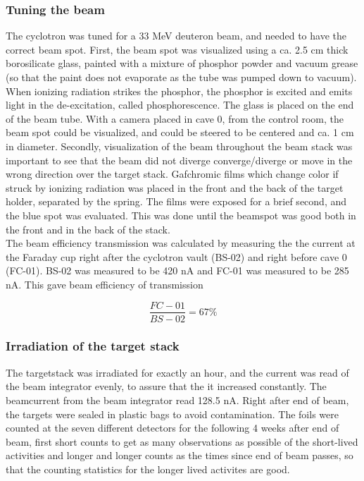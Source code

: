 \subsubsection{Tuning the beam}
The cyclotron was tuned for a 33 MeV deuteron beam, and needed to have the correct beam spot. First, the beam spot was visualized using a ca. 2.5 cm thick borosilicate glass, painted with a mixture of phosphor powder and vacuum grease (so that the paint does not evaporate as the tube was pumped down to vacuum). When ionizing radiation strikes the phosphor, the phosphor is excited and emits light in the de-excitation, called phosphorescence.  The glass is placed on the end of the beam tube. With a camera placed in cave 0, from the control room, the beam spot could be visualized, and could be steered to be centered and ca. 1 cm in diameter. Secondly, visualization of the beam throughout the beam stack was important to see that the beam did not diverge converge/diverge or move in the wrong direction over the target stack. Gafchromic films which change color if struck by ionizing radiation was placed in the front and the back of the target holder, separated by the spring. The films were exposed for a brief second, and the blue spot was evaluated. This was done until the beamspot was good both in the front and in the back of the stack. \\

\noindent
The beam efficiency transmission was calculated by measuring the the current at the Faraday cup right after the cyclotron vault (BS-02) and right before cave 0 (FC-01). BS-02 was measured to be 420 nA and FC-01 was measured to be 285 nA. This gave beam efficiency of transmission

$$\frac{FC-01}{BS-02}=67\% $$

\subsubsection{Irradiation of the target stack}

The targetstack was irradiated for exactly an hour, and the current was read of the beam integrator evenly, to assure that the it increased constantly. The beamcurrent from the beam integrator read 128.5 nA.  %
Right after end of beam, the targets were sealed in plastic bags to avoid contamination. The foils were counted at the seven different detectors for the following 4 weeks after end of beam, first short counts to get as many observations as possible of the short-lived activities and longer and longer counts as the times since end of beam passes, so that the counting statistics for the longer lived activites are good. 

